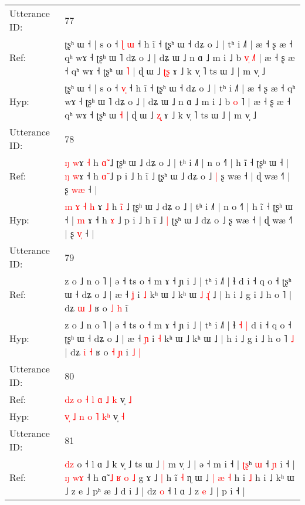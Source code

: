 \documentclass[10pt]{article}
\DeclareRobustCommand{\hl}[1]{{\textcolor{red}{#1}}}
\begin{document}
\begin{longtable}{ll}
\midrule
Utterance ID: & 77 \\
Ref: & ʈʂʰ ɯ ˧ | s o ˧ \hl{ɭ}\hl{ }\hl{ɯ} ˧ h ĩ ˧ ʈʂʰ ɯ ˧ dʑ o ˩ | tʰ i ˩˥ | æ ˧ ʂ æ ˧ qʰ wɤ ˧ ʈʂʰ ɯ ˥ dʑ o ˩ | dʑ ɯ ˩ n ɑ ˩ m i ˩ b \hl{v}\hl{̩} \hl{˩}˥ | æ ˧ ʂ æ ˧ qʰ wɤ ˧ ʈʂʰ ɯ \hl{˥} | ɖ ɯ ˩ \hl{ʈ}\hl{ʂ} ɤ ˩ k v̩ ˥ ts ɯ ˩ | m v̩ ˩
 \\
Hyp: & ʈʂʰ ɯ ˧ | s o ˧ \hl{}\hl{v}\hl{̩} ˧ h ĩ ˧ ʈʂʰ ɯ ˧ dʑ o ˩ | tʰ i ˩˥ | æ ˧ ʂ æ ˧ qʰ wɤ ˧ ʈʂʰ ɯ ˥ dʑ o ˩ | dʑ ɯ ˩ n ɑ ˩ m i ˩ b \hl{}\hl{o} \hl{}˥ | æ ˧ ʂ æ ˧ qʰ wɤ ˧ ʈʂʰ ɯ \hl{˧} | ɖ ɯ ˩ \hl{}\hl{ʐ} ɤ ˩ k v̩ ˥ ts ɯ ˩ | m v̩ ˩
 \\
\midrule
Utterance ID: & 78 \\
Ref: & \hl{}\hl{}\hl{}\hl{}\hl{ŋ} \hl{}\hl{w}ɤ \hl{˧} h \hl{ɑ}̃ ˩ ʈʂʰ ɯ ˩ dʑ o ˩ | tʰ i ˩˥ | n o ˧˥ | h ĩ ˧ ʈʂʰ ɯ ˧ | \hl{ŋ} \hl{w}ɤ ˧ h \hl{ɑ}\hl{̃} ˩ p i ˩ h ĩ ˩\hl{}\hl{} ʈʂʰ ɯ ˩ dʑ o ˩\hl{ }\hl{|} ʂ wæ ˧ | ɖ wæ ˧˥ | ʂ \hl{w}\hl{æ} ˧ |
 \\
Hyp: & \hl{m}\hl{ }\hl{ɤ}\hl{ }\hl{˧} \hl{h}\hl{ }ɤ \hl{˩} h \hl{i}̃ ˩ ʈʂʰ ɯ ˩ dʑ o ˩ | tʰ i ˩˥ | n o ˧˥ | h ĩ ˧ ʈʂʰ ɯ ˧ | \hl{m} \hl{}ɤ ˧ h \hl{}\hl{ɤ} ˩ p i ˩ h ĩ ˩\hl{ }\hl{|} ʈʂʰ ɯ ˩ dʑ o ˩\hl{}\hl{} ʂ wæ ˧ | ɖ wæ ˧˥ | ʂ \hl{v}\hl{̩} ˧ |
 \\
\midrule
Utterance ID: & 79 \\
Ref: & z o ˩ n o ˥ | ə ˧ ts o ˧ m ɤ ˧ ɲ i ˩ | tʰ i ˩˥ | ɬ\hl{}\hl{}\hl{}\hl{} d i ˧ q o ˧ ʈʂʰ ɯ ˧ dʑ o ˩ | æ ˧ \hl{ʝ} i \hl{˩} kʰ ɯ ˩ kʰ ɯ\hl{ }\hl{˩}\hl{ }\hl{ɻ}\hl{̍} ˩ | h i ˩ g i ˩ h o ˥\hl{}\hl{} | dʑ \hl{ɯ} \hl{˩} ʁ o \hl{˩} \hl{h} i\hl{}\hl{}\hl{}\hl{̃}
 \\
Hyp: & z o ˩ n o ˥ | ə ˧ ts o ˧ m ɤ ˧ ɲ i ˩ | tʰ i ˩˥ | ɬ\hl{ }\hl{˧}\hl{ }\hl{|} d i ˧ q o ˧ ʈʂʰ ɯ ˧ dʑ o ˩ | æ ˧ \hl{ɲ} i \hl{˧} kʰ ɯ ˩ kʰ ɯ\hl{}\hl{}\hl{}\hl{}\hl{} ˩ | h i ˩ g i ˩ h o ˥\hl{ }\hl{˩} | dʑ \hl{i} \hl{˧} ʁ o \hl{˧} \hl{ɲ} i\hl{ }\hl{˩}\hl{ }\hl{|}
 \\
\midrule
Utterance ID: & 80 \\
Ref: & \hl{d}\hl{z} \hl{o} \hl{˧} \hl{l} \hl{ɑ} \hl{˩}\hl{ }\hl{k} v̩ \hl{˩}
 \\
Hyp: & \hl{v}\hl{̩} \hl{˩} \hl{n} \hl{o} \hl{˥} \hl{}\hl{k}\hl{ʰ} v̩ \hl{˧}
 \\
\midrule
Utterance ID: & 81 \\
Ref: & \hl{d}\hl{z} o ˧ l ɑ ˩ k v̩ ˩ ts ɯ ˩\hl{ }\hl{|} m v̩ ˩ | ə ˧ m i ˧ | \hl{ʈ}\hl{ʂ}ʰ \hl{ɯ} ˧\hl{}\hl{} \hl{ɲ} i ˧ | \hl{ŋ} \hl{w}\hl{ɤ} ˧ h ɑ̃\hl{ }\hl{˩}\hl{ }\hl{ʁ}\hl{ }\hl{o}\hl{ }\hl{˩} g ɤ ˩\hl{ }\hl{|} h ĩ \hl{˧} ɳ ɯ ˩ \hl{|} \hl{æ} \hl{˧} h i \hl{˩} h i ˩ kʰ ɯ ˩ z e ˩ pʰ æ ˩ d i ˩ | dz \hl{o} ˧ l ɑ ˩ z \hl{e} ˩ | p i ˧ |

\end{longtable}
\end{document}
